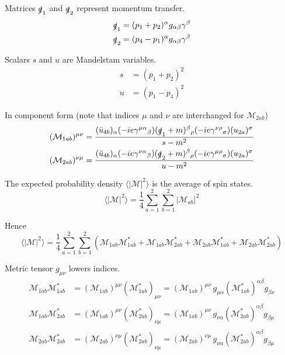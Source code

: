 Matrices $\slashed q_1$ and $\slashed q_2$ represent momentum transfer.
\begin{align*}
\slashed q_1&=(p_1+p_2)^\alpha g_{\alpha\beta}\gamma^\beta
\\
\slashed q_2&=(p_4-p_1)^\alpha g_{\alpha\beta}\gamma^\beta
\end{align*}

Scalars $s$ and $u$ are Mandelstam variables.
\begin{align*}
s&=(p_1+p_2)^2
\\
u&=(p_1-p_4)^2
\end{align*}

In component form (note that indices $\mu$ and $\nu$ are interchanged for $\mathcal M_{2ab}$)
\begin{align*}
(\mathcal M_{1ab})^{\mu\nu}=\frac{
(\bar{u}_{4b})_\alpha
(-ie\gamma^{\mu\alpha}{}_\beta)
(\slashed{q}_1+m)^\beta{}_\rho
(-ie\gamma^{\nu\rho}{}_\sigma)
(u_{2a})^\sigma}{s-m^2}
\\
(\mathcal M_{2ab})^{\nu\mu}=\frac{
(\bar{u}_{4b})_\alpha
(-ie\gamma^{\nu\alpha}{}_\beta)
(\slashed{q}_2+m)^\beta{}_\rho
(-ie\gamma^{\mu\rho}{}_\sigma)
(u_{2a})^\sigma}{u-m^2}
\end{align*}

The expected probability density $\langle|\mathcal M|^2\rangle$
is the average of spin states.
\begin{equation*}
\langle|\mathcal M|^2\rangle=\frac{1}{4}\sum_{a=1}^2\sum_{b=1}^2|\mathcal M_{ab}|^2
\end{equation*}

Hence
\begin{equation*}
\langle|\mathcal{M}|^2\rangle
=\frac{1}{4}\sum_{a=1}^2\sum_{b=1}^2
\left(
\mathcal M_{1ab}\mathcal M_{1ab}^*
+\mathcal M_{1ab}\mathcal M_{2ab}^*+\mathcal M_{2ab}\mathcal M_{1ab}^*
+\mathcal M_{2ab}\mathcal M_{2ab}^*
\right)
\end{equation*}

Metric tensor $g_{\mu\nu}$ lowers indices.
\begin{align*}
\mathcal M_{1ab}\mathcal M_{1ab}^*&=(\mathcal M_{1ab})^{\mu\nu}(\mathcal M_{1ab}^*)_{\mu\nu}
=(\mathcal M_{1ab})^{\mu\nu}\,g_{\mu\alpha}(\mathcal M_{1ab}^*)^{\alpha\beta}g_{\beta\nu}
\\
\mathcal M_{1ab}\mathcal M_{2ab}^*&=(\mathcal M_{1ab})^{\mu\nu}(\mathcal M_{2ab}^*)_{\nu\mu}
=(\mathcal M_{1ab})^{\mu\nu}\,g_{\nu\alpha}(\mathcal M_{2ab}^*)^{\alpha\beta}g_{\beta\mu}
\\
\mathcal M_{2ab}\mathcal M_{2ab}^*&=(\mathcal M_{2ab})^{\nu\mu}(\mathcal M_{2ab}^*)_{\nu\mu}
=(\mathcal M_{2ab})^{\nu\mu}\,g_{\nu\alpha}(\mathcal M_{2ab}^*)^{\alpha\beta}g_{\beta\mu}
\end{align*}

